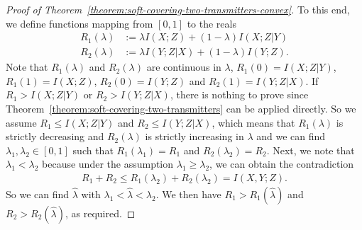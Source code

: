 \documentclass[journal]{IEEEtran}
\newcommand{\codebookRateOne}{R_1}
\newcommand{\codebookRateTwo}{R_2}
\newcommand{\channelInOne}{X}
\newcommand{\channelInTwo}{Y}
\newcommand{\channelOut}{Z}
\newcommand{\mutualInformation}[2]{I(#1;#2)}
\newcommand{\mutualInformationConditional}[3]{I(#1;#2|#3)}
\newcommand{\convexityParam}{\lambda}
\begin{document}
\begin{proof}[Proof of Theorem~\ref{theorem:soft-covering-two-transmitters-convex}]
To this end, we define functions mapping from $[0,1]$ to the reals
\begin{align*}
\codebookRateOne(\convexityParam)
&:=
\convexityParam \mutualInformation{\channelInOne}{\channelOut}
+
(1-\convexityParam) \mutualInformationConditional{\channelInOne}{\channelOut}{\channelInTwo}
\\
\codebookRateTwo(\convexityParam)
&:=
\convexityParam \mutualInformationConditional{\channelInTwo}{\channelOut}{\channelInOne}
+
(1-\convexityParam) \mutualInformation{\channelInTwo}{\channelOut}.
\end{align*}
Note that $\codebookRateOne(\convexityParam)$ and $\codebookRateTwo(\convexityParam)$ are continuous in $\convexityParam$, $\codebookRateOne(0) = \mutualInformationConditional{\channelInOne}{\channelOut}{\channelInTwo}$, $\codebookRateOne(1) = \mutualInformation{\channelInOne}{\channelOut}$, $\codebookRateTwo(0) = \mutualInformation{\channelInTwo}{\channelOut}$ and $\codebookRateTwo(1) = \mutualInformationConditional{\channelInTwo}{\channelOut}{\channelInOne}$. If $\codebookRateOne > \mutualInformationConditional{\channelInOne}{\channelOut}{\channelInTwo}$ or $\codebookRateTwo > \mutualInformationConditional{\channelInTwo}{\channelOut}{\channelInOne}$, there is nothing to prove since Theorem~\ref{theorem:soft-covering-two-transmitters} can be applied directly. So we assume $\codebookRateOne \leq \mutualInformationConditional{\channelInOne}{\channelOut}{\channelInTwo}$ and $\codebookRateTwo \leq \mutualInformationConditional{\channelInTwo}{\channelOut}{\channelInOne}$, which means that $\codebookRateOne(\convexityParam)$ is strictly decreasing and $\codebookRateTwo(\convexityParam)$ is strictly increasing in $\convexityParam$ and we can find $\convexityParam_1, \convexityParam_2 \in [0,1]$ such that $\codebookRateOne(\convexityParam_1) = \codebookRateOne$ and $\codebookRateTwo(\convexityParam_2) = \codebookRateTwo$. Next, we note that $\convexityParam_1 < \convexityParam_2$ because under the assumption $\convexityParam_1 \geq \convexityParam_2$, we can obtain the contradiction
\begin{align*}
\codebookRateOne + \codebookRateTwo \leq \codebookRateOne(\convexityParam_2) + \codebookRateTwo(\convexityParam_2) = \mutualInformation{\channelInOne, \channelInTwo}{\channelOut}.
\end{align*}
So we can find $\hat{\convexityParam}$ with $\convexityParam_1 < \hat{\convexityParam} < \convexityParam_2$. We then have $\codebookRateOne > \codebookRateOne(\hat{\convexityParam})$ and $\codebookRateTwo > \codebookRateTwo(\hat{\convexityParam})$, as required.
\end{proof}
\end{document}
